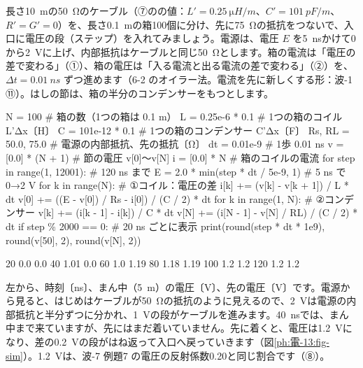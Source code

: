 長さ\qty{10}{m}の\qty{50}{\ohm}のケーブル（⑦のの値：$L'=\qty{0.25}{\micro H/m}$、$C'=\qty{101}{pF/m}$、$R'=G'=0$）を、長さ\qty{0.1}{m}の箱100個に分け、先に\qty{75}{\ohm}の抵抗をつないで、入口に電圧の段（ステップ）を入れてみましょう。電源は、電圧 $E$ を\qty{5}{ns}かけて0から\qty{2}{V}に上げ、内部抵抗はケーブルと同じ\qty{50}{\ohm}とします。箱の電流は「電圧の差で変わる」（①）、箱の電圧は「入る電流と出る電流の差で変わる」（②）を、$\Delta t=\qty{0.01}{ns}$ ずつ進めます（6-2 のオイラー法。電流を先に新しくする形：波-1 ⑪）。はしの節は、箱の半分のコンデンサーをもつとします。
\begin{phcode}[Python]
N = 100                     \# 箱の数（1つの箱は 0.1 m）
L = 0.25e-6 * 0.1           \# 1つの箱のコイル L'Δx〔H〕
C = 101e-12 * 0.1           \# 1つの箱のコンデンサー C'Δx〔F〕
Rs, RL = 50.0, 75.0         \# 電源の内部抵抗、先の抵抗〔Ω〕
dt = 0.01e-9                \# 1歩 0.01 ns
v = [0.0] * (N + 1)         \# 節の電圧 v[0]〜v[N]
i = [0.0] * N               \# 箱のコイルの電流
for step in range(1, 12001):           \# 120 ns まで
    E = 2.0 * min(step * dt / 5e-9, 1)  \# 5 ns で 0→2 V
    for k in range(N):                 \# ①コイル：電圧の差
        i[k] += (v[k] - v[k + 1]) / L * dt
    v[0] += ((E - v[0]) / Rs - i[0]) / (C / 2) * dt
    for k in range(1, N):              \# ②コンデンサー
        v[k] += (i[k - 1] - i[k]) / C * dt
    v[N] += (i[N - 1] - v[N] / RL) / (C / 2) * dt
    if step \% 2000 == 0:               \# 20 ns ごとに表示
        print(round(step * dt * 1e9), round(v[50], 2), round(v[N], 2))
\end{phcode}
\begin{phcodeout}
20 0.0 0.0
40 1.01 0.0
60 1.0 1.19
80 1.18 1.19
100 1.2 1.2
120 1.2 1.2
\end{phcodeout}
左から、時刻〔ns〕、まん中（\qty{5}{m}）の電圧〔V〕、先の電圧〔V〕です。電源から見ると、はじめはケーブルが\qty{50}{\ohm}の抵抗のように見えるので、\qty{2}{V}は電源の内部抵抗と半分ずつに分かれ、\qty{1}{V}の段がケーブルを進みます。\qty{40}{ns}では、まん中まで来ていますが、先にはまだ着いていません。先に着くと、電圧は\qty{1.2}{V}になり、差の\qty{0.2}{V}の段がはね返って入口へ戻っていきます（図\ref{ph:電-13:fig-sim}）。\qty{1.2}{V}は、波-7 例題7 の電圧の反射係数0.20と同じ割合です（⑧）。

